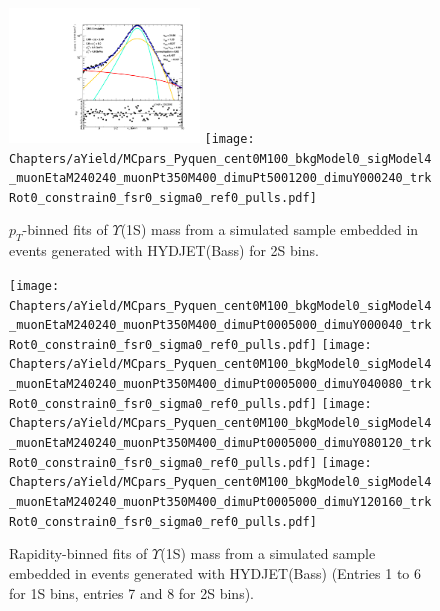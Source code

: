 \begin{figure}
\begin{center} 
\includegraphics[width=0.45\textwidth]{Chapters/aYield/MCpars_Pyquen_cent0M100_bkgModel0_sigModel4_muonEtaM240240_muonPt350M400_dimuPt000500_dimuY000240_trkRot0_constrain0_fsr0_sigma0_ref0_pulls.pdf}
\texttt{[image: Chapters/aYield/MCpars\_Pyquen\_cent0M100\_bkgModel0\_sigModel4\_muonEtaM240240\_muonPt350M400\_dimuPt5001200\_dimuY000240\_trkRot0\_constrain0\_fsr0\_sigma0\_ref0\_pulls.pdf]}  
\caption{$p_{T}$-binned fits of $\Upsilon$(1S) mass from a simulated
  sample embedded in events generated with
  HYDJET(Bass) for 2S bins.}
\label{fig:fsrFitPyquenPt2}
\end{center}
\end{figure}

\begin{figure}
\begin{center}
\texttt{[image: Chapters/aYield/MCpars\_Pyquen\_cent0M100\_bkgModel0\_sigModel4\_muonEtaM240240\_muonPt350M400\_dimuPt0005000\_dimuY000040\_trkRot0\_constrain0\_fsr0\_sigma0\_ref0\_pulls.pdf]} 
\texttt{[image: Chapters/aYield/MCpars\_Pyquen\_cent0M100\_bkgModel0\_sigModel4\_muonEtaM240240\_muonPt350M400\_dimuPt0005000\_dimuY040080\_trkRot0\_constrain0\_fsr0\_sigma0\_ref0\_pulls.pdf]}
\texttt{[image: Chapters/aYield/MCpars\_Pyquen\_cent0M100\_bkgModel0\_sigModel4\_muonEtaM240240\_muonPt350M400\_dimuPt0005000\_dimuY080120\_trkRot0\_constrain0\_fsr0\_sigma0\_ref0\_pulls.pdf]}
\texttt{[image: Chapters/aYield/MCpars\_Pyquen\_cent0M100\_bkgModel0\_sigModel4\_muonEtaM240240\_muonPt350M400\_dimuPt0005000\_dimuY120160\_trkRot0\_constrain0\_fsr0\_sigma0\_ref0\_pulls.pdf]} 
\caption{Rapidity-binned fits of $\Upsilon$(1S) mass from a simulated
  sample embedded in events generated with
  HYDJET(Bass) (Entries 1 to 6 for 1S bins, entries 7 and 8 for 2S bins).}
\label{fig:fsrFitPyquenRap}
\end{center}
\end{figure}


